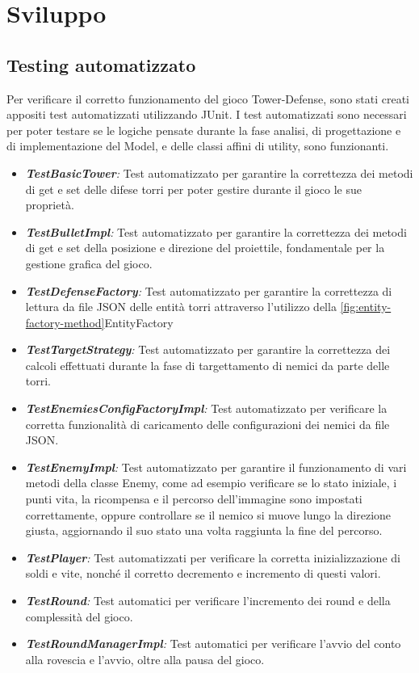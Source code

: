 \documentclass[a4paper,12pt]{report}
\begin{document}
\chapter{Sviluppo}
\section{Testing automatizzato}
Per verificare il corretto funzionamento del gioco Tower-Defense, sono stati creati appositi test automatizzati utilizzando JUnit. 
I test automatizzati sono necessari per poter testare se le logiche pensate durante la fase analisi, di progettazione e di implementazione del Model, e delle classi affini di utility, sono funzionanti.


\begin{itemize}
    \item \textit{\textbf{TestBasicTower}:} Test automatizzato per garantire la correttezza dei metodi di get e set delle difese torri per poter gestire durante il gioco le sue proprietà.
    \item \textit{\textbf{TestBulletImpl}:} Test automatizzato per garantire la correttezza dei metodi di get e set della posizione e direzione del proiettile, fondamentale per la gestione grafica del gioco.
    \item \textit{\textbf{TestDefenseFactory}:} Test automatizzato per garantire la correttezza di lettura da file JSON delle entità torri attraverso l'utilizzo della \ref{fig:entity-factory-method}EntityFactory
    \item \textit{\textbf{TestTargetStrategy}:} Test automatizzato per garantire la correttezza dei calcoli effettuati durante la fase di targettamento di nemici da parte delle torri.
    \item \textit{\textbf{TestEnemiesConfigFactoryImpl}:} Test automatizzato per verificare la corretta funzionalità di caricamento delle configurazioni dei nemici da file JSON.
    \item \textit{\textbf{TestEnemyImpl}:} Test automatizzato per garantire il funzionamento di vari metodi della classe Enemy, come ad esempio verificare se lo stato iniziale, i punti vita, la ricompensa e il percorso dell'immagine sono impostati correttamente, oppure controllare se il nemico si muove lungo la direzione giusta,  aggiornando il suo stato una volta raggiunta la fine del percorso. 
	\item \textit{\textbf{TestPlayer}:} Test automatizzati per verificare la corretta inizializzazione di soldi e vite, nonché il corretto decremento e incremento di questi valori.
	\item \textit{\textbf{TestRound}:} Test automatici per verificare l'incremento dei round e della complessità del gioco.
	\item \textit{\textbf{TestRoundManagerImpl}:} Test automatici per verificare l'avvio del conto alla rovescia e l'avvio, oltre alla pausa del gioco.
\end{itemize}
\end{document}

